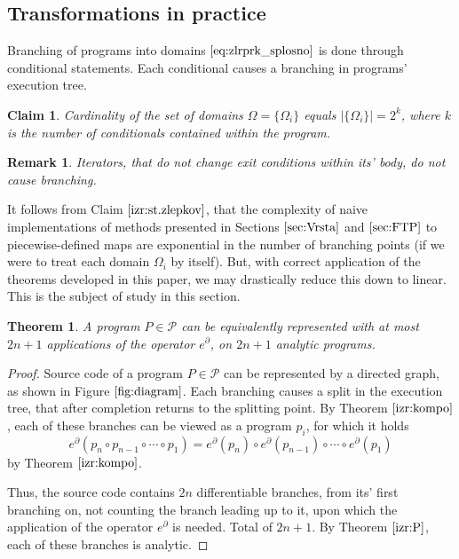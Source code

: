 \documentclass[smallcondensed]{svjour3}
\newcommand{\dP}{\mathcal{P}}
\newcommand{\D}{\partial}
\newtheorem{trditev}{Claim}[section]
\newtheorem{izrek}{Theorem}[section]
\newtheorem{opomba}{Remark}[section]
\begin{document}
\subsection{Transformations in practice} \label{sec:TransInPractice}

Branching of programs into domains $\eqref{eq:zlrprk_splosno}$ is done through conditional statements. Each conditional causes a branching in programs' execution tree.

\begin{trditev}\label{izr:st.zlepkov}
Cardinality of the set of domains $\Omega=\{\Omega_i\}$ equals $\lvert\{\Omega_i \}\rvert=2^k$, where $k$ is the number of conditionals contained within the program.
\end{trditev}
\begin{opomba}
Iterators, that do not change exit conditions within its' body, do not cause branching.
\end{opomba}


It follows from Claim $\ref{izr:st.zlepkov}$, that the complexity of naive
implementations of methods presented in Sections $\ref{sec:Vrsta}$ and
$\ref{sec:FTP}$ to piecewise-defined maps are exponential in the number of
branching points (if we were to treat each domain $\Omega_i$ by itself). But,
with correct application of the theorems developed in this paper, we may drastically reduce this down to linear. This is the subject of study in this section.


\begin{izrek}
A program $P\in\dP$ can be equivalently represented with at most $2n+1$ applications of the operator $e^\D$, on $2n+1$ analytic programs.
\end{izrek}

\begin{proof}
	Source code of a program $P\in\dP$ can be represented by a directed graph, as shown in Figure $\ref{fig:diagram}$. Each branching causes a split in the execution tree, that after completion returns to the splitting point.
	By Theorem $\ref{izr:kompo}$, each of these branches can be viewed as a program $p_i$, for which it holds $$e^\D(p_n\circ p_{n-1}\circ\cdots\circ p_1)=e^\D(p_n)\circ e^\D(p_{n-1})\circ\cdots\circ e^\D(p_1)$$ by Theorem $\ref{izr:kompo}$.
	
	Thus, the source code contains $2n$ differentiable branches, from its' first branching on, not counting the branch leading up to it, upon which the application of the operator $e^\D$ is needed. Total of $2n+1$. By Theorem $\ref{izr:P}$, each of these branches is analytic.
\end{proof}
\end{document}
